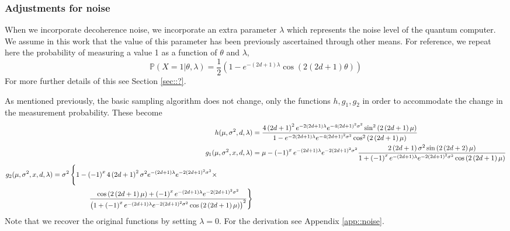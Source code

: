 \subsubsection{Adjustments for noise}
When we incorporate decoherence noise, we incorporate an extra parameter $\lambda$ which represents the noise level of the quantum computer. We assume in this work that the value of this parameter has been previously ascertained through other means. For reference, we repeat here the probability of measuring a value 1 as a function of $\theta$ and $\lambda$,
$$\mathbb{P}(X=1| \theta, \lambda)= \frac{1}{2}\left( 1 - e^{-\left( 2d+1 \right) \lambda} \cos\left( 2\left( 2d+1 \right) \theta \right)  \right)  $$
For more further details of this see Section \ref{sec::?}.

As mentioned previously, the basic sampling algorithm does not change, only the functions $h, g_1, g_2$ in order to accommodate the change in the measurement probability. These become
\begin{align}
	h(\mu,\sigma^2,d, \lambda) & = \frac{4 \left( 2d+1 \right) ^2 e^{-2\left( 2d+1 \right) \lambda} e^{ - 4\left( 2d+1 \right) ^2 \sigma^2} \sin^2\left( 2 \left( 2d+1 \right) \mu \right) }{1-e^{-2\left( 2d+1 \right) \lambda} e^{-4\left( 2d+1 \right) ^2\sigma^2}\cos^2\left( 2\left( 2d+1 \right) \mu \right) } \label{eqn::nvarfactor} \\
	g_1(\mu,\sigma^2,x,d, \lambda) &= \mu - \left( -1 \right) ^{x}e^{-\left( 2d+1 \right) \lambda}e^{- 2\left( 2d+1 \right) ^2 \sigma^2} \frac{ 2 \left( 2d+1 \right) \sigma^2 \sin\left( 2\left( 2d+2 \right) \mu \right) }{1 + \left( -1 \right) ^{x}e^{-\left( 2d+1 \right) \lambda} e^{-2\left( 2d+1 \right) ^2 \sigma^2} \cos\left( 2\left( 2d+1 \right) \mu \right) } \label{eqn::nmean} \\
\begin{split}
	g_2(\mu,\sigma^2,x,d, \lambda)  &= \sigma^2 \left\{\vphantom{\frac{\cos\left( 2\left( 2d+1 \right) \mu \right)  + \left( -1 \right) ^{x}e^{- 2\left( 2d+1 \right) ^2 \sigma^2}}{\left( 1 + \left( -1 \right) ^{x} e^{-2\left( 2d+1 \right)^2 \sigma^2 } \cos\left( 2\left( 2d+1 \right) \mu \right)  \right)^2 }}  1 - \left( -1 \right) ^{x}4\left( 2d+1 \right) ^2 \sigma^2 e^{-\left( 2d+1 \right) \lambda}e^{- 2\left( 2d+1 \right) ^2 \sigma^2} \times  \right.  \\
			      & \hspace{50pt} \left. \frac{\cos\left( 2\left( 2d+1 \right) \mu \right)  + \left( -1 \right) ^{x}e^{-\left( 2d+1 \right) \lambda}e^{- 2\left( 2d+1 \right) ^2 \sigma^2}}{\left( 1 + \left( -1 \right) ^{x}e^{-\left( 2d+1 \right) \lambda} e^{-2\left( 2d+1 \right)^2 \sigma^2 } \cos\left( 2\left( 2d+1 \right) \mu \right)  \right)^2 }  \right\} \label{eqn::nvar}
\end{split}
\end{align}
Note that we recover the original functions by setting $ \lambda = 0$.
For the derivation see Appendix \ref{app::noise}.


